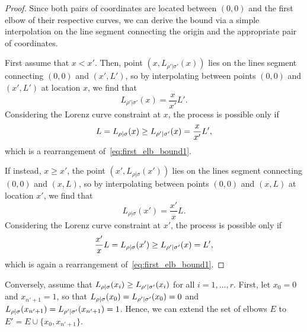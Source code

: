 \documentclass[pra,
aps,
twocolumn,
superscriptaddress,
groupedaddress,
nofootinbib,
reprint
]{revtex4-1}
\begin{document}
\begin{proof}
Since both pairs of coordinates are located between $(0,0)$ and the first elbow of their respective curves, we can derive the bound via a simple interpolation on the line segment connecting the origin and the appropriate pair of coordinates.

First assume that $x < x'$.
Then, point $(x, L_{\rho'|\sigma'}(x))$ lies on the lines segment connecting $(0,0)$ and $(x', L')$, so by interpolating between points $(0,0)$ and $(x', L')$ at location $x$, we find that
\begin{equation}
	L_{\rho'|\sigma'}(x) = \frac{x}{x'}L'.
\end{equation}
Considering the Lorenz curve constraint at $x$, the process is possible only if 
\begin{equation}
	L = {L_{\rho|\sigma}}(x) \geq {L_{\rho'|\sigma'}}(x) = \frac{x}{x'}L',
\end{equation}
which is a rearrangement of~\cref{eq:first_elb_bound1}.

If instead, $x \geq x'$, the point $(x', L_{\rho|\sigma}(x'))$ lies on the lines segment connecting $(0,0)$ and $(x, L)$, so by interpolating between points $(0,0)$ and $(x, L)$ at location $x'$, we find that
\begin{equation}
	L_{\rho|\sigma}(x') = \frac{x'}{x}L.
\end{equation}
Considering the Lorenz curve constraint at $x'$, the process is possible only if 
\begin{equation}
	\frac{x'}{x}L = {L_{\rho|\sigma}}(x') \geq {L_{\rho'|\sigma'}}(x) = L',
\end{equation}
which is again a rearrangement of~\cref{eq:first_elb_bound1}.
\end{proof}


	Conversely, assume that ${L_{\rho|\sigma}}(x_{i}) \geq {L_{\rho'|\sigma'}}(x_{i})$ for all $i = 1,\dots,r$.
	First, let $x_0 = 0$ and $x_{n'+1} = 1$, so that ${L_{\rho|\sigma}}(x_0) = {L_{\rho'|\sigma'}}(x_0) = 0$ and ${L_{\rho|\sigma}}(x_{n'+1}) = {L_{\rho'|\sigma'}}(x_{n'+1}) = 1$.
	Hence, we can extend the set of elbows $E$ to $E' = E \cup \{x_0, x_{n'+1}\}$.
	
\end{document}
